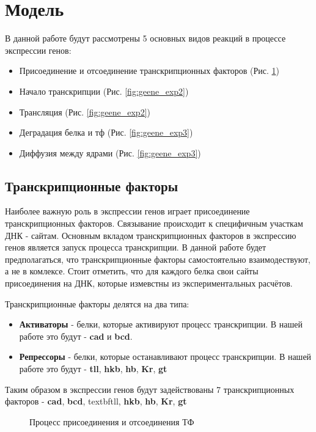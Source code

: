 \section{Модель}

В данной работе будут рассмотрены 5 основных видов реакций в процессе экспрессии генов:
\begin{itemize}
  \item Присоединение и отсоединение транскрипционных факторов (Рис. \ref{fig:geene_exp1})
  \item Начало транскрипции (Рис. \ref{fig:geene_exp2})
  \item Трансляция (Рис. \ref{fig:geene_exp2})
  \item Деградация белка и тф (Рис. \ref{fig:geene_exp3})
  \item Диффузия между ядрами (Рис. \ref{fig:geene_exp3})
\end{itemize}

\subsection{Транскрипционные факторы}

Наиболее важную роль в экспрессии генов играет присоединение транскрипционных факторов. Связывание происходит к специфичным участкам ДНК - сайтам. Основным
вкладом транскрипционных факторов в экспрессию генов является запуск процесса транскрипции. В данной работе будет предполагаться, что транскрипционные факторы
самостоятельно взаимодествуют, а не в комлексе. Стоит отметить, что для каждого белка свои сайты присоединения на ДНК, которые измевстны из
экспериментальных расчётов.

Транскрипционные факторы делятся на два типа:
\begin{itemize}
  \item \textbf{Активаторы} - белки, которые активируют процесс транскрипции. В нашей работе это будут - \textbf{cad} и \textbf{bcd}.
  \item \textbf{Репрессоры} - белки, которые останавливают процесс транскрипции. В нашей работе это будут - \textbf{tll}, \textbf{hkb}, \textbf{hb},
   \textbf{Kr}, \textbf{gt}
\end{itemize}

Таким образом в экспрессии генов будут задействованы 7 транскрипционных факторов - \textbf{cad}, \textbf{bcd}, textbf{tll}, \textbf{hkb}, \textbf{hb},
 \textbf{Kr}, \textbf{gt}

\begin{figure}[!h]
  \caption{Процесс присоединения и отсоединения ТФ}
  \label{fig:geene_exp1}
\end{figure}


